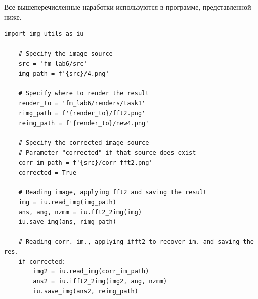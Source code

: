 \documentclass[a4paper, 12pt]{article}
\begin{document}
    Все вышеперечисленные наработки используются в программе, представленной ниже.
    \begin{lstlisting}[label=task11, caption={Реализация задания 1}]
    import img_utils as iu

    # Specify the image source
    src = 'fm_lab6/src'
    img_path = f'{src}/4.png'

    # Specify where to render the result
    render_to = 'fm_lab6/renders/task1'
    rimg_path = f'{render_to}/fft2.png'
    reimg_path = f'{render_to}/new4.png'

    # Specify the corrected image source
    # Parameter "corrected" if that source does exist
    corr_im_path = f'{src}/corr_fft2.png'
    corrected = True

    # Reading image, applying fft2 and saving the result
    img = iu.read_img(img_path)
    ans, ang, nzmm = iu.fft2_2img(img)
    iu.save_img(ans, rimg_path)

    # Reading corr. im., applying ifft2 to recover im. and saving the res.
    if corrected:
        img2 = iu.read_img(corr_im_path)
        ans2 = iu.ifft2_2img(img2, ang, nzmm)
        iu.save_img(ans2, reimg_path)
    \end{lstlisting}
\end{document}
